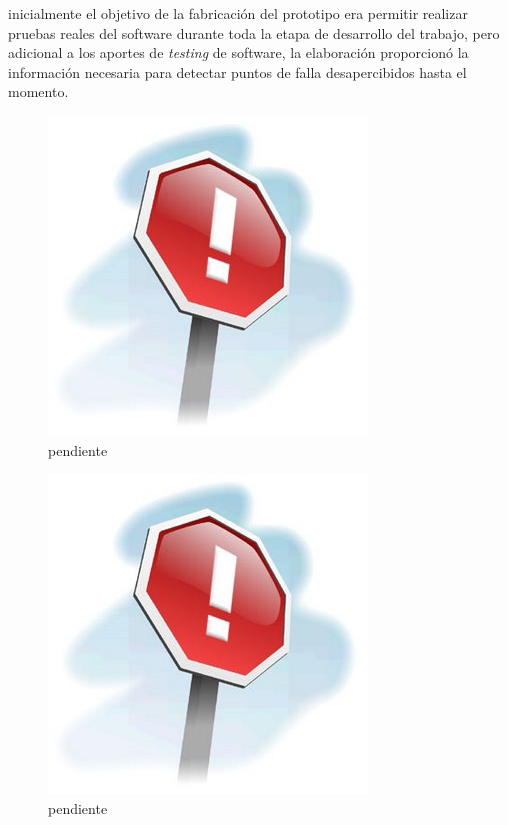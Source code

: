 inicialmente el objetivo de la fabricación del prototipo era permitir realizar pruebas reales del software durante toda la etapa de desarrollo del trabajo, pero adicional a los aportes de \textit{testing} de software, la elaboración proporcionó la información necesaria para detectar puntos de falla desapercibidos hasta el momento.

\begin{figure}[ht]
	\centering
	\includegraphics[scale=.45]{./Figures/Capitulo4/pendiente.jpg}
	\caption{pendiente}
	\label{fig:figura_1}
\end{figure}
\begin{figure}[ht]
	\centering
	\includegraphics[scale=.45]{./Figures/Capitulo4/pendiente.jpg}
	\caption{pendiente}
	\label{fig:figura_2}
\end{figure}

